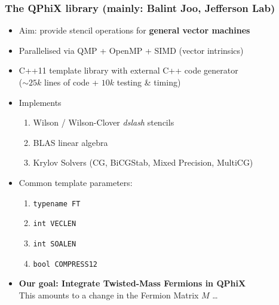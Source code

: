 \documentclass{beamer}
\begin{document}
  \begin{frame}
    \frametitle{The QPhiX library (mainly: Balint Joo, Jefferson Lab)}

    \begin{itemize}
      \item Aim: provide stencil operations for \textbf{general vector machines}
        \vfill
      \item Parallelised via QMP + OpenMP + SIMD (vector intrinsics)
        \vfill
      \item C++11 template library with external C++ code generator\\
        ($\sim25k$ lines of code + $10k$ testing \& timing)
        \vfill
      \item Implements
        \begin{enumerate}
          \item Wilson / Wilson-Clover \textit{dslash} stencils
          \item BLAS linear algebra
          \item Krylov Solvers (CG, BiCGStab, Mixed Precision, MultiCG)
        \end{enumerate}
        \vfill
      \item Common template parameters:
        \begin{enumerate}
          \item \texttt{typename FT}
          \item \texttt{int VECLEN}
          \item \texttt{int SOALEN}
          \item \texttt{bool COMPRESS12}
        \end{enumerate}
        \vfill
      \item \textbf{Our goal: Integrate Twisted-Mass Fermions in QPhiX}\\
        This amounts to a change in the Fermion Matrix $M$ \dots
    \end{itemize}

  \end{frame}

\end{document}
